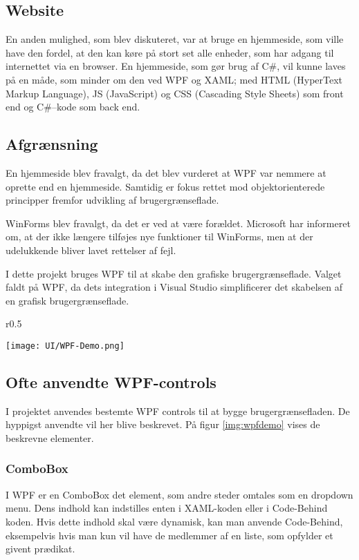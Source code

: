 \subsection{Website}
En anden mulighed, som blev diskuteret, var at bruge en hjemmeside, som ville have den fordel, at den kan køre på stort set alle enheder, som har adgang til internettet via en browser. 
En hjemmeside, som gør brug af C\#, vil kunne laves på en måde, som minder om den ved WPF og XAML; med HTML (HyperText Markup Language), JS (JavaScript) og CSS (Cascading Style Sheets) som front end og C\#--kode som back end. 

\subsection{Afgrænsning}
En hjemmeside blev fravalgt, da det blev vurderet at WPF var nemmere at oprette end en hjemmeside.
Samtidig er fokus rettet mod objektorienterede principper fremfor udvikling af brugergrænseflade.

WinForms blev fravalgt, da det er ved at være forældet.
Microsoft har informeret om, at der ikke længere tilføjes nye funktioner til WinForms, men at der udelukkende bliver lavet rettelser af fejl.\citep{winforms}

I dette projekt bruges \ac{WPF} til at skabe den grafiske brugergrænseflade. 
Valget faldt på \ac{WPF}, da dets integration i Visual Studio simplificerer det skabelsen af en grafisk brugergrænseflade.


\begin{wrapfigure}[22]{r}{0.5\textwidth}
    \label{img:wpfdemo}
    \vspace{-30pt}
    \begin{center}
        \texttt{[image: UI/WPF-Demo.png]}
    \end{center}
    \vspace{-15pt}
    \caption{Demonstration af WPFs Controls}
    \vspace{-15pt}
\end{wrapfigure}

\subsection{Ofte anvendte WPF-controls}
I projektet anvendes bestemte WPF controls til at bygge brugergrænsefladen. 
De hyppigst anvendte vil her blive beskrevet. 
På figur \ref{img:wpfdemo} vises de beskrevne elementer.


\subsubsection*{ComboBox}
I WPF er en ComboBox det element, som andre steder omtales som en dropdown menu. 
Dens indhold kan indstilles enten i XAML-koden eller i Code-Behind koden.
Hvis dette indhold skal være dynamisk, kan man anvende Code-Behind, eksempelvis hvis man kun vil have de medlemmer af en liste, som opfylder et givent prædikat.


